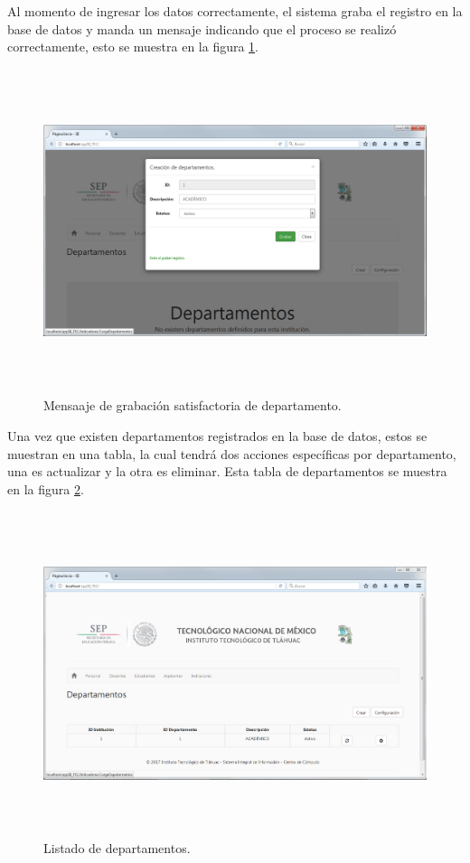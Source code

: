 		    Al momento de ingresar los datos correctamente, el sistema graba el registro en la base de datos y manda un mensaje indicando que el proceso se realiz\'o correctamente, esto se muestra en la figura \ref{img_DepartamentoGraba}.\\

		    \begin{figure}[]
		        \centering
		        \includegraphics[width=16cm, height=9.5cm]{figuras/DepartamentosGraba}
		        \caption{Mensaaje de grabaci\'on satisfactoria de departamento.}
		        \label{img_DepartamentoGraba}
		    \end{figure}

		    Una vez que existen departamentos registrados en la base de datos, estos se muestran en una tabla, la cual tendr\'a dos acciones espec\'ificas por departamento, una es actualizar y la otra es eliminar. Esta tabla de departamentos se muestra en la figura \ref{fig_DepartamentoTabla}.\\

		    \begin{figure}[]
		        \centering
		        \includegraphics[width=16cm, height=9.5cm]{figuras/DepartamentosTabla}
		        \caption{Listado de departamentos.}
		        \label{fig_DepartamentoTabla}
		    \end{figure}
			
